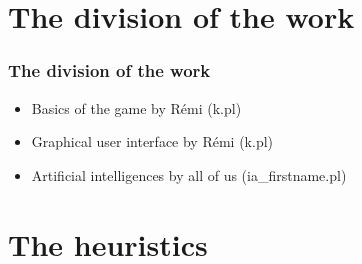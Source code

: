 \documentclass[a4paper, 11pt]{beamer}
\begin{document}
\section{The division of the work}
\begin{frame}
 \frametitle{The division of the work}
 \begin{itemize}
  \item Basics of the game by Rémi (k.pl)
  \item Graphical user interface by Rémi (k.pl)
  \item Artificial intelligences by all of us (ia\_firstname.pl)
 \end{itemize}
\end{frame}

\section{The heuristics}
\end{document}
